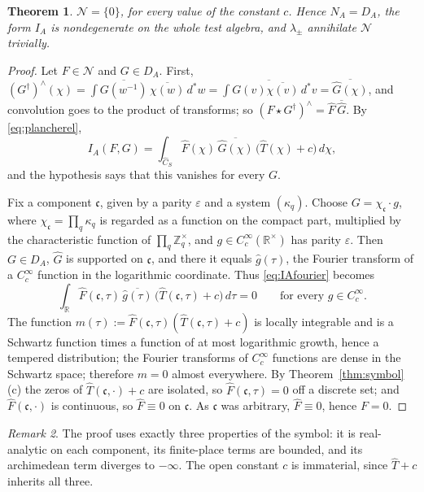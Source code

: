 \documentclass[11pt]{amsart}
\newtheorem{theorem}{Theorem}[section]
\theoremstyle{definition}
\theoremstyle{remark}
\newtheorem{remark}[theorem]{Remark}
\newcommand{\R}{\mathbb R}
\newcommand{\Z}{\mathbb Z}
\newcommand{\dstar}{\,d^{*}}
\newcommand{\Th}{\widehat{T}}
\newcommand{\Ch}{\widehat{C}_S}
\newcommand{\DA}{D_A}
\newcommand{\Nrad}{\mathcal N}
\begin{document}
\begin{theorem}\label{thm:radical}
$\Nrad=\{0\}$, for every value of the constant $c$.  Hence $N_A=\DA$, the form
$I_A$ is nondegenerate on the whole test algebra, and $\lambda_{\pm}$
annihilate $\Nrad$ trivially.
\end{theorem}

\begin{proof}
Let $F\in\Nrad$ and $G\in\DA$.  First,
$(G^{\dagger})^{\wedge}(\chi)=\int\overline{G(w^{-1})}\,\overline{\chi(w)}
\dstar w=\overline{\int G(v)\overline{\chi(v)}\dstar v}=\overline{\widehat
G(\chi)}$, and convolution goes to the product of transforms; so
$(F\star G^{\dagger})^{\wedge}=\widehat F\,\overline{\widehat G}$.  By
\eqref{eq:plancherel},
\begin{equation}\label{eq:IAfourier}
I_A(F,G)=\int_{\Ch}\widehat F(\chi)\,\overline{\widehat G(\chi)}\,
\bigl(\Th(\chi)+c\bigr)\,d\chi ,
\end{equation}
and the hypothesis says that this vanishes for every $G$.

Fix a component $\mathfrak c$, given by a parity $\varepsilon$ and a system
$(\kappa_q)$.  Choose $G=\chi_{\mathfrak c}\cdot g$, where
$\chi_{\mathfrak c}=\prod_q\kappa_q$ is regarded as a function on the compact
part, multiplied by the characteristic function of $\prod_q\Z_q^{\times}$, and
$g\in C_c^{\infty}(\R^{\times})$ has parity $\varepsilon$.  Then $G\in\DA$,
$\widehat G$ is supported on $\mathfrak c$, and there it equals
$\widehat g(\tau)$, the Fourier transform of a $C_c^{\infty}$ function in the
logarithmic coordinate.  Thus \eqref{eq:IAfourier} becomes
\[
\int_{\R}\widehat F(\mathfrak c,\tau)\,\overline{\widehat g(\tau)}\,
\bigl(\Th(\mathfrak c,\tau)+c\bigr)\,d\tau=0
\qquad\text{for every } g\in C_c^{\infty}.
\]
The function $m(\tau):=\widehat F(\mathfrak c,\tau)(\Th(\mathfrak c,\tau)+c)$
is locally integrable and is a Schwartz function times a function of at most
logarithmic growth, hence a tempered distribution; the Fourier transforms of
$C_c^{\infty}$ functions are dense in the Schwartz space; therefore $m=0$
almost everywhere.  By Theorem~\ref{thm:symbol}(c) the zeros of
$\Th(\mathfrak c,\cdot)+c$ are isolated, so $\widehat F(\mathfrak c,\tau)=0$ off
a discrete set; and $\widehat F(\mathfrak c,\cdot)$ is continuous, so
$\widehat F\equiv0$ on $\mathfrak c$.  As $\mathfrak c$ was arbitrary,
$\widehat F\equiv0$, hence $F=0$.
\end{proof}

\begin{remark}
The proof uses exactly three properties of the symbol: it is real-analytic on
each component, its finite-place terms are bounded, and its archimedean term
diverges to $-\infty$.  The open constant $c$ is immaterial, since $\Th+c$
inherits all three.
\end{remark}
\end{document}
